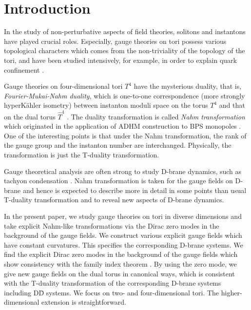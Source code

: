 \documentclass[a4paper,epsf,12pt]{article}
\newcommand{\Th}{\hat{T}}
\begin{document}
\baselineskip 6mm

\section{Introduction}

In the study of non-perturbative aspects of field theories,
solitons and instantons have played crucial roles.
Especially, gauge theories on tori possess various
topological characters which comes from the non-triviality
of the topology of the tori, 
and have been studied intensively,
for example,
in order to explain quark confinement \cite{tHooft, Gonzalez}.

Gauge theories on four-dimensional tori $T^4$ have the mysterious duality,
that is, {\it Fourier-Mukai-Nahm duality},
which is one-to-one correspondence 
(more strongly hyperK\"ahler isometry) %
between instanton moduli space on the torus $T^4$ and
that on the dual torus $\Th^4$ \cite{Mukai, Schenk, BvB, DoKr}.
The duality transformation is called {\it Nahm transformation}
which originated in the application of ADHM construction \cite{ADHM}
to BPS monopoles \cite{Nahm}.
One of the interesting points is that
under the Nahm transformation, 
the rank of the gauge group and
the instanton number %
are interchanged.
Physically, the transformation is just the T-duality transformation. 

Gauge theoretical analysis are often strong to
study D-brane dynamics, such as tachyon condensation \cite{Harvey}.
Nahm transformation is taken for the gauge fields on D-brane
and hence is expected to describe more in detail in some points
than usual T-duality transformation
and to reveal new aspects of D-brane dynamics.

In the present paper, we study gauge theories on tori
in diverse dimensions and take explicit Nahm-like transformations
via the Dirac zero modes in the background of the gauge fields.
We construct various explicit gauge fields which have
constant curvatures.
This specifies the corresponding D-brane systems. %
We find the explicit Dirac zero modes in the background
of the gauge fields which show consistency
with the family index theorem \cite{AtSi}.
By using the zero mode,
we give new gauge fields on the dual torus in canonical ways,
which is consistent with the T-duality
transformation of the corresponding D-brane systems
including D\=D systems.
We focus on two- and four-dimensional tori.
The higher-dimensional extension is straightforward. %
\end{document}
